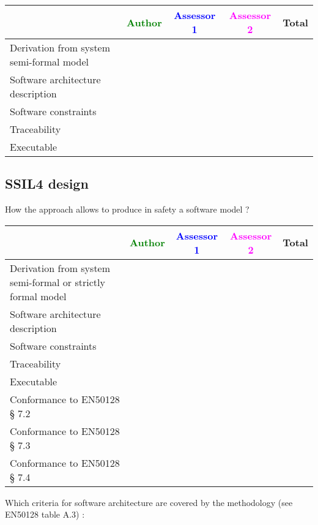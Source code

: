 \begin{tabular}{|l | c | c | c | c|}
\hline
& \textcolor{green}{Author} & \textcolor{blue}{Assessor 1} & \textcolor{magenta}{Assessor 2} & Total \\
\hline
Derivation from system semi-formal model  & & & &  \\
\hline 
Software architecture description  & & & &  \\
\hline
Software constraints  & & & &  \\
\hline
Traceability  & & & &  \\
\hline
Executable  & & & &  \\
\hline
\end{tabular}

\subsection{SSIL4 design}

How the approach allows to  produce in safety a software model ?

\begin{tabular}{|l | c | c | c | c|}
\hline
& \textcolor{green}{Author} & \textcolor{blue}{Assessor 1} & \textcolor{magenta}{Assessor 2} & Total \\
\hline
Derivation from system semi-formal or strictly formal model  & & & &  \\
\hline 
Software architecture description  & & & &  \\
\hline
Software constraints  & & & &  \\
\hline
Traceability  & & & &  \\
\hline
Executable  & & & &  \\
\hline
Conformance to EN50128 § 7.2  & & & &  \\
\hline
Conformance to EN50128 § 7.3  & & & &  \\
\hline
Conformance to EN50128 § 7.4  & & & &  \\
\hline
\end{tabular}

Which criteria for software architecture are covered by the methodology
(see EN50128 table A.3) :

